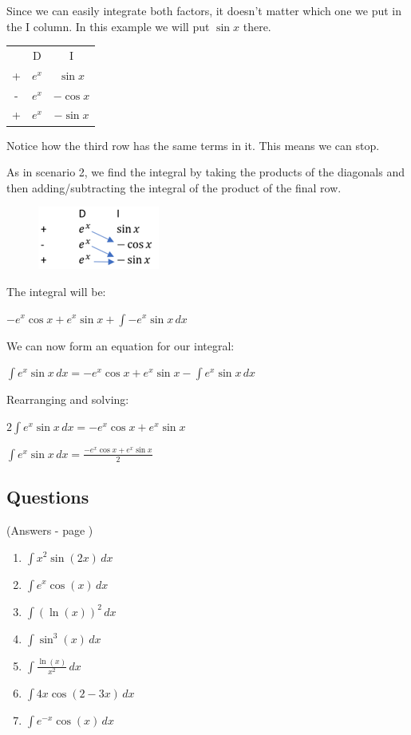 \documentclass[../main.tex]{subfiles}
\begin{document}
Since we can easily integrate both factors, it doesn’t matter which one we put in the I column. In this example we will put \(\sin{x}\) there.

\begin{tabular}{ c c c }
   & D & I \\ 
 +  & $e^x$ &$\sin{x}$ \\  
 - & $e^x$ & $-\cos{x}$\\
  + & $e^x$ & $-\sin{x}$ \\  
\end{tabular}

Notice how the third row has the same terms in it. This means we can stop.

As in scenario 2, we find the integral by taking the products of the diagonals and then adding/subtracting the integral of the product of the final row.

\begin{figure}[h]
    \includegraphics{images/dimethod3.png}
\end{figure}

The integral will be:

\(-e^x\cos{x}+e^x\sin{x}+\int -e^x\sin{x}\,dx\)

We can now form an equation for our integral:

\(\int e^x \sin{x}\,dx=-e^x\cos{x}+e^x\sin{x}-\int e^x\sin{x}\,dx\)

Rearranging and solving:

\(2\int e^x \sin{x}\,dx=-e^x\cos{x}+e^x\sin{x}\)

\(\int e^x \sin{x}\, dx=\frac{-e^x\cos{x}+e^x\sin{x}}{2}\)

\pagebreak

\subsection*{Questions}
(Answers - page \pageref*{DI method answers})
\label{DI Method}
\begin{enumerate}
    \item \(\int x^2\sin{(2x)}\, dx\)

    \item \(\int e^x \cos{(x)}\, dx\)

    \item \(\int (\ln{(x)})^2\, dx\)

    \item \(\int \sin^3{(x)}\,dx\)

    \item \(\int \frac{\ln{(x)}}{x^2}\, dx\)

    \item \(\int 4x\cos{(2-3x)}\, dx\)

    \item \(\int e^{-x}\cos{(x)}\, dx\)

    
\end{enumerate}


\pagebreak
\end{document}
